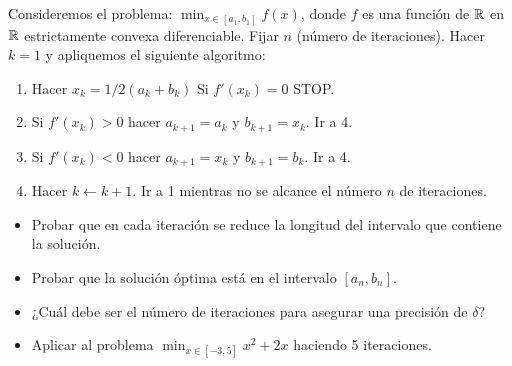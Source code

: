 \documentclass[twoside]{article}
\begin{document}
\newpage

\begin{ejercicio}{2}
Consideremos el problema: $\min_{x\in[a_1,b_1]}f(x)$, donde $f$ es una función de $\mathbb{R}$ en $\mathbb{R}$ estrictamente convexa diferenciable. Fijar $n$ (número de iteraciones). Hacer $k=1$ y apliquemos el siguiente algoritmo:
\begin{enumerate}
\item Hacer $x_k=1/2(a_k+b_k)$ Si $f'(x_k)=0$ STOP.
\item Si $f'(x_k)>0$ hacer $a_{k+1}=a_k$ y $b_{k+1}=x_k$. Ir a 4.
\item Si $f'(x_k)<0$ hacer $a_{k+1}=x_k$ y $b_{k+1}=b_k$. Ir a 4. 
\item Hacer $k\leftarrow k+1$. Ir a 1 mientras no se alcance el número $n$ de iteraciones.
\end{enumerate}
\begin{itemize}
\item Probar que en cada iteración se reduce la longitud del intervalo que contiene la solución.
\item Probar que la solución óptima está en el intervalo $[a_n,b_n]$. 
\item ¿Cuál debe ser el número de iteraciones para asegurar una precisión de $\delta$?
\item Aplicar al problema $\min_{x\in[-3,5]}x^2+2x$ haciendo 5 iteraciones.
\end{itemize}
\end{ejercicio}
\end{document}
